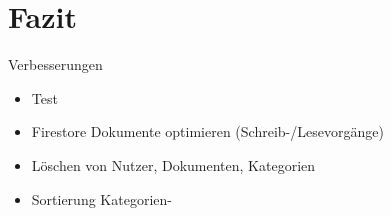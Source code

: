 \section{Fazit}\label{sec:fazit}
Verbesserungen
\begin{itemize}
    \item Test
    \item Firestore Dokumente optimieren (Schreib-/Lesevorgänge)
     \item Löschen von Nutzer, Dokumenten, Kategorien
    \item Sortierung Kategorien-
\end{itemize}